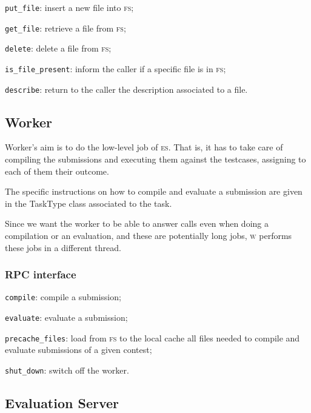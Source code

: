 \documentclass[a4paper,8pt]{amsart}
\newcommand{\FS}{\textsc{fs}}
\newcommand{\ES}{\textsc{es}}
\newcommand{\WS}{\textsc{w}}
\newenvironment{squishlist}{%
  \begin{list}{\textbullet}%
    { \setlength{\itemsep}{0pt}%
      \setlength{\parsep}{3pt}%
      \setlength{\topsep}{3pt}%
      \setlength{\partopsep}{0pt}%
      \setlength{\leftmargin}{1.5em}%
      \setlength{\labelwidth}{1em}%
      \setlength{\labelsep}{0.5em} }%
}{\end{list}}
\newcommand{\id}[1]{\texttt{#1}}
\begin{document}
\begin{multicols}{2}
  \begin{squishlist}
  \item \id{put\_file}: insert a new file into \FS{};
  \item \id{get\_file}: retrieve a file from \FS{};
  \item \id{delete}: delete a file from \FS{};
  \item \id{is\_file\_present}: inform the caller if a specific file is
    in \FS{};
  \item \id{describe}: return to the caller the description associated
    to a file.
  \end{squishlist}

  \subsection{Worker}

  Worker's aim is to do the low-level job of \ES{}. That is, it
  has to take care of compiling the submissions and executing them
  against the testcases, assigning to each of them their outcome.

  The specific instructions on how to compile and evaluate a
  submission are given in the TaskType class associated to the task.

  Since we want the worker to be able to answer calls even when doing
  a compilation or an evaluation, and these are potentially long jobs,
  \WS{} performs these jobs in a different thread.

  \subsubsection{RPC interface}

  \begin{squishlist}
  \item \id{compile}: compile a submission;
  \item \id{evaluate}: evaluate a submission;
  \item \id{precache\_files}: load from \FS{} to the local cache all
    files needed to compile and evaluate submissions of a given
    contest;
  \item \id{shut\_down}: switch off the worker.
  \end{squishlist}

  \subsection{Evaluation Server}


\end{multicols}
\end{document}
